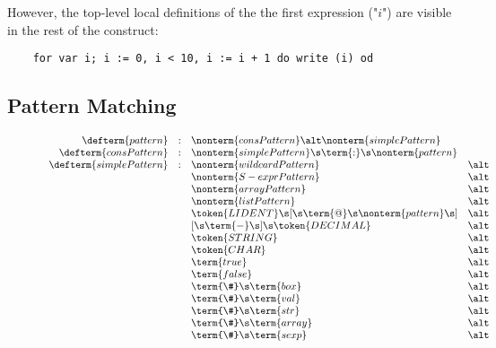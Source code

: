 However, the top-level local definitions of the the first expression ("$i$") are visible in the rest of the construct:

\begin{lstlisting}
    for var i; i := 0, i < 10, i := i + 1 do write (i) od
\end{lstlisting}

\subsection{Pattern Matching}

\begin{figure}[t]
  \[
    \begin{array}{rcll}
      \defterm{pattern}         & : & \nonterm{consPattern}\alt\nonterm{simplePattern}&\\
      \defterm{consPattern}     & : & \nonterm{simplePattern}\s\term{:}\s\nonterm{pattern}&\\
      \defterm{simplePattern}   & : & \nonterm{wildcardPattern} & \alt\\
                                &   & \nonterm{S-exprPattern} & \alt \\
                                &   & \nonterm{arrayPattern} & \alt \\
                                &   & \nonterm{listPattern} & \alt \\
                                &   & \token{LIDENT}\s[\s\term{@}\s\nonterm{pattern} \s] & \alt \\
                                &   & [\s\term{-}\s]\s\token{DECIMAL}& \alt \\
                                &   & \token{STRING} & \alt \\
                                &   & \token{CHAR} & \alt \\
                                &   & \term{true} & \alt \\
                                &   & \term{false} & \alt \\
                                &   & \term{\#}\s\term{box} & \alt \\
                                &   & \term{\#}\s\term{val} & \alt \\
                                &   & \term{\#}\s\term{str} & \alt \\
                                &   & \term{\#}\s\term{array} & \alt \\
                                &   & \term{\#}\s\term{sexp} & \alt \\

\end{array}\]
\end{figure}
